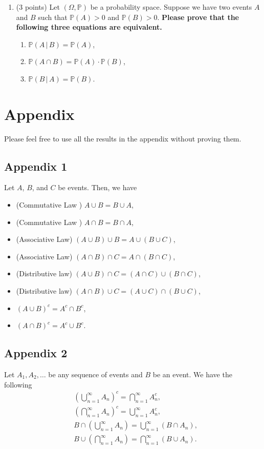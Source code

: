 \documentclass[11pt]{article}
\begin{document}
\begin{enumerate}
\item (3 points) Let $(\Omega,\mathbb{P})$ be a probability space. Suppose we have two events $A$ and $B$ such that $\mathbb{P}(A)>0$ and $\mathbb{P}(B)>0$. \textbf{Please prove that the following three equations are equivalent.}
    \begin{enumerate}
        \item $\mathbb{P}(A\,\vert\,B)=\mathbb{P}(A)$,
        \item $\mathbb{P}(A\cap B)=\mathbb{P}(A)\cdot \mathbb{P}(B)$,
        \item $\mathbb{P}(B\,\vert\,A)=\mathbb{P}(B)$.
    \end{enumerate}

\end{enumerate}


\newpage

\section{Appendix}

Please feel free to use all the results in the appendix without proving them.

\subsection{Appendix 1}

Let $A$, $B$, and $C$ be events. Then, we have
\begin{itemize}
\item (Commutative Law ) $A\cup B=B\cup A$,
\item (Commutative Law ) $A\cap B= B\cap A$,
\item (Associative Law) $(A\cup B)\cup B=A\cup (B\cup C)$,
\item (Associative Law) $(A\cap B)\cap C= A\cap(B\cap C)$,
\item (Distributive law) $(A\cup B)\cap C=(A\cap C)\cup (B\cap C)$,
\item (Distributive law) $(A\cap B)\cup C=(A\cup C)\cap (B\cup C)$,
\item $ (A\cup B)^c=A^c\cap B^c$,
\item $ (A\cap B)^c=A^c\cup B^c$.
\end{itemize}

\subsection{Appendix 2}

Let $A_1,A_2,\ldots$ be any sequence of events and $B$ be an event. We have the following
\begin{align*}
& \left(\bigcup_{n=1}^\infty A_n\right)^c = \bigcap_{n=1}^\infty A_n^c, \\
& \left(\bigcap_{n=1}^\infty A_n\right)^c = \bigcup_{n=1}^\infty A_n^c, \\
& B\cap\left(\bigcup_{n=1}^\infty A_n\right) = \bigcup_{n=1}^\infty (B\cap A_n),\\
& B\cup\left(\bigcap_{n=1}^\infty A_n\right) = \bigcap_{n=1}^\infty (B\cup A_n).
\end{align*}
\end{document}
